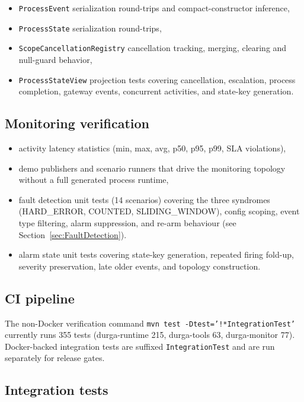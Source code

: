 \begin{itemize}
\item \texttt{ProcessEvent} serialization round-trips and compact-constructor inference,
\item \texttt{ProcessState} serialization round-trips,
\item \texttt{ScopeCancellationRegistry} cancellation tracking, merging, clearing and null-guard behavior,
\item \texttt{ProcessStateView} projection tests covering cancellation, escalation,
process completion, gateway events, concurrent activities, and state-key generation.
\end{itemize}

\subsection{Monitoring verification}

\begin{itemize}
\item activity latency statistics (min, max, avg, p50, p95, p99, SLA violations),
\item demo publishers and scenario runners that drive the monitoring topology
without a full generated process runtime,
\item fault detection unit tests (14 scenarios) covering the three syndromes
(HARD\_ERROR, COUNTED, SLIDING\_WINDOW), config scoping, event type
filtering, alarm suppression, and re-arm behaviour (see
Section~\ref{sec:FaultDetection}).
\item alarm state unit tests covering state-key generation, repeated firing
fold-up, severity preservation, late older events, and topology construction.
\end{itemize}

\subsection{CI pipeline}

The non-Docker verification command \texttt{mvn test -Dtest='!*IntegrationTest'}
currently runs 355 tests (durga-runtime 215, durga-tools 63, durga-monitor 77).
Docker-backed integration tests are suffixed
\texttt{IntegrationTest} and are run separately for release gates.

\subsection{Integration tests}


